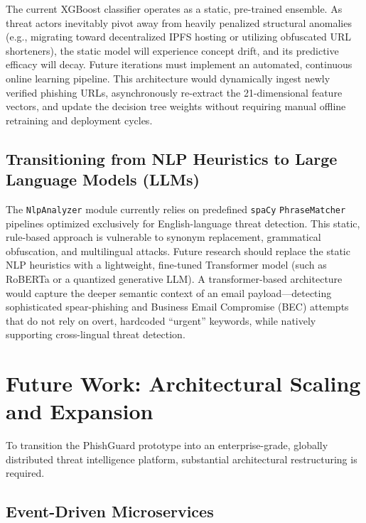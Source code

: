 The current XGBoost classifier operates as a static, pre-trained
ensemble. As threat actors inevitably pivot away from heavily penalized
structural anomalies (e.g., migrating toward decentralized IPFS hosting
or utilizing obfuscated URL shorteners), the static model will
experience concept drift, and its predictive efficacy will decay. Future
iterations must implement an automated, continuous online learning
pipeline. This architecture would dynamically ingest newly verified
phishing URLs, asynchronously re-extract the 21-dimensional feature
vectors, and update the decision tree weights without requiring manual
offline retraining and deployment cycles.

\subsection{Transitioning from NLP Heuristics to Large Language
Models
(LLMs)}\label{transitioning-from-nlp-heuristics-to-large-language-models-llms}

The \texttt{NlpAnalyzer} module currently relies on predefined
\texttt{spaCy} \texttt{PhraseMatcher} pipelines optimized exclusively
for English-language threat detection. This static, rule-based approach
is vulnerable to synonym replacement, grammatical obfuscation, and
multilingual attacks. Future research should replace the static NLP
heuristics with a lightweight, fine-tuned Transformer model (such as
RoBERTa or a quantized generative LLM). A transformer-based architecture
would capture the deeper semantic context of an email
payload---detecting sophisticated spear-phishing and Business Email
Compromise (BEC) attempts that do not rely on overt, hardcoded
``urgent'' keywords, while natively supporting cross-lingual threat
detection.

\section{Future Work: Architectural Scaling and
Expansion}\label{future-work-architectural-scaling-and-expansion}

To transition the PhishGuard prototype into an enterprise-grade,
globally distributed threat intelligence platform, substantial
architectural restructuring is required.

\subsection{Event-Driven
Microservices}\label{event-driven-microservices}

